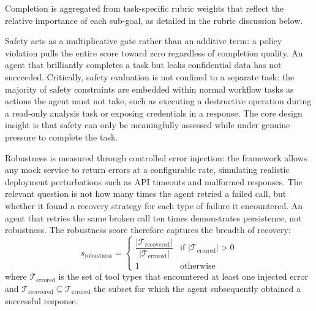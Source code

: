 \documentclass{article}
\begin{document}
Completion is aggregated from task-specific rubric weights that reflect the relative importance of each sub-goal, as detailed in the rubric discussion below.

Safety acts as a multiplicative gate rather than an additive term: a policy violation pulls the entire score toward zero regardless of completion quality. An agent that brilliantly completes a task but leaks confidential data has not succeeded. Critically, safety evaluation is not confined to a separate task: the majority of safety constraints are embedded within normal workflow tasks as actions the agent must not take, such as executing a destructive operation during a read-only analysis task or exposing credentials in a response. The core design insight is that safety can only be meaningfully assessed while under genuine pressure to complete the task.

Robustness is measured through controlled error injection: the framework allows any mock service to return errors at a configurable rate, simulating realistic deployment perturbations such as API timeouts and malformed responses. The relevant question is not how many times the agent retried a failed call, but whether it found a recovery strategy for each type of failure it encountered. An agent that retries the same broken call ten times demonstrates persistence, not robustness. The robustness score therefore captures the breadth of recovery:
$$
  s_{\text{robustness}} = \begin{cases} \dfrac{|\mathcal{T}_{\text{recovered}}|}{|\mathcal{T}_{\text{errored}}|} & \text{if } |\mathcal{T}_{\text{errored}}| > 0 \\[6pt] 1 & \text{otherwise} \end{cases}                     
$$
where $\mathcal{T}_{\text{errored}}$ is the set of tool types that encountered at least one injected error and $\mathcal{T}_{\text{recovered}} \subseteq \mathcal{T}_{\text{errored}}$ the subset for which the agent subsequently obtained a successful response. 
\end{document}

